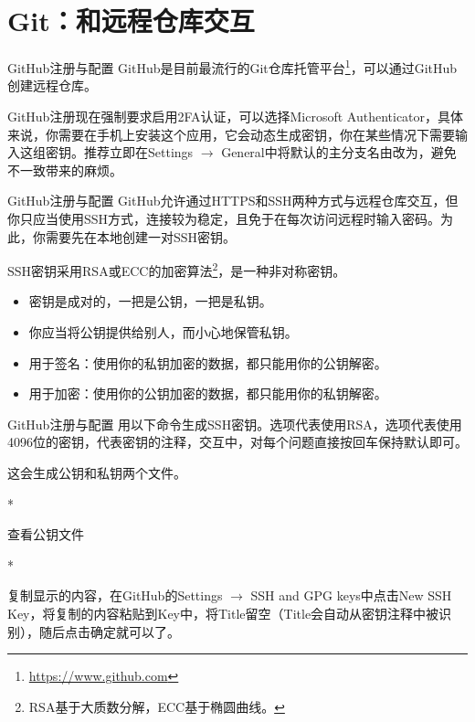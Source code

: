 \section{Git：和远程仓库交互}

\begin{frame}{GitHub注册与配置}
    GitHub是目前最流行的Git仓库托管平台\footnote{\url{https://www.github.com}}，可以通过GitHub创建远程仓库。

    GitHub注册现在强制要求启用2FA认证，可以选择Microsoft Authenticator，具体来说，你需要在手机上安装这个应用，它会动态生成密钥，你在某些情况下需要输入这组密钥。推荐立即在Settings $\to$ General中将默认的主分支名由改为，避免不一致带来的麻烦。
\end{frame}

\begin{frame}{GitHub注册与配置}
    GitHub允许通过HTTPS和SSH两种方式与远程仓库交互，\alert{但你只应当使用SSH方式}，连接较为稳定，且免于在每次访问远程时输入密码。为此，你需要先在本地创建一对SSH密钥。

    SSH密钥采用RSA或ECC的加密算法\footnote{RSA基于大质数分解，ECC基于椭圆曲线。}，是一种非对称密钥。
    \begin{itemize}
        \item 密钥是成对的，一把是公钥，一把是私钥。
        \item 你应当将公钥提供给别人，而小心地保管私钥。
        \item 用于签名：使用你的私钥加密的数据，都只能用你的公钥解密。
        \item 用于加密：使用你的公钥加密的数据，都只能用你的私钥解密。
    \end{itemize}
\end{frame}

\begin{frame}{GitHub注册与配置}
    用以下命令生成SSH密钥。选项代表使用RSA，选项代表使用4096位的密钥，代表密钥的注释，交互中，对每个问题直接按回车保持默认即可。
    
    这会生成公钥和私钥两个文件。
    \begin{Code}*
        
    \end{Code}
    查看公钥文件
    \begin{Code}*
        
    \end{Code}
    复制显示的内容，在GitHub的Settings $\to$ SSH and GPG keys中点击New SSH Key，将复制的内容粘贴到Key中，将Title留空（Title会自动从密钥注释中被识别），随后点击确定就可以了。
\end{frame}

